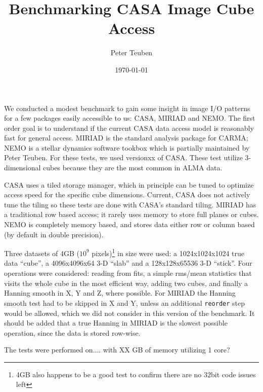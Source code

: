 \documentclass{article}
\title{Benchmarking CASA Image Cube Access}
\author{Peter Teuben}
\date{\today}
\begin{document}
\maketitle


We conducted a modest benchmark to gain some insight in image
I/O patterns for a few packages easily accessible to us: CASA,
MIRIAD and NEMO. The first order goal is to understand if the
current CASA data access model is reasonably fast for general
access.
MIRIAD is the standard analysis package for
CARMA; NEMO is a stellar dynamics software tookbox which is
partially maintained by Peter Teuben. For these tests, we
used versionxx of CASA. These test utilize 3-dimensional cubes
because they are the most common in ALMA data.

CASA uses a tiled storage manager, which in principle
can be tuned to optimize access speed for the specific
cube dimensions.  Current, CASA does not actively tune
the tiling so these tests are done with CASA's standard tiling.
MIRIAD has a traditional row based access; it rarely
uses memory to store full planes or cubes. NEMO is completely
memory based, and stores data either row or column based
(by default in double precision).

Three datasets of 4GB ($10^9$ pixels)\footnote{4GB also happens to
be a good test to confirm there are no 32bit code issues left}
in size were used:
a 1024x1024x1024 true data ``cube'',
a 4096x4096x64 3-D ``slab'' and a 128x128x65536 3-D ``stick''.
Four operations were considered:  reading from fits,
a simple rms/mean statistics that visits the whole cube in the
most efficient way, adding two cubes, and finally
a Hanning smooth in X, Y and Z, where possible.  For MIRIAD
the Hanning smooth test had to be skipped in X and Y, unless
an additional {\tt reorder} step would be allowed, which we did
not consider in this version of the benchmark.
It should be added that a true Hanning in MIRIAD
is the slowest possible operation, since the data is stored
row-wise.

The tests were performed on.... with XX GB of memory utilizing 1 core?
\end{document}
